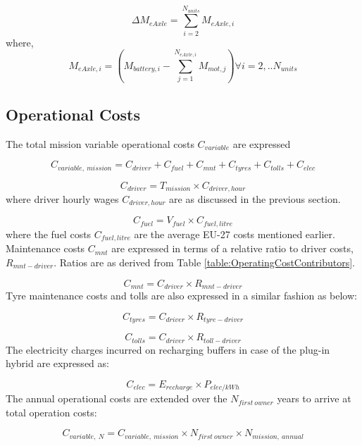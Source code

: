 \documentclass[ExampleMasters.tex]{subfiles}
\begin{document}
			\begin{equation}
				\Delta M_{eAxle} = \displaystyle \sum_{i=2}^{N_{units}} M_{eAxle,i}
			\end{equation}
			where, 
			\begin{equation}
				M_{eAxle,i} = (M_{battery,i} - \sum_{j=1}^{N_{eAxle,i}} M_{mot,j}) \forall i=2,..N_{units}
			\end{equation}

		\subsection{Operational Costs}
			The total mission variable operational costs $C_{variable}$ are expressed
			
			\begin{equation}
				C_{variable,\ mission} = C_{driver} + C_{fuel} + C_{mnt} + C_{tyres} + C_{tolls} + C_{elec}
			\end{equation}

			\begin{equation}
				C_{driver} = T_{mission} \times C_{driver, hour}
			\end{equation}
			where driver hourly wages $C_{driver, hour}$ are as discussed in the previous section.

			\begin{equation}
				C_{fuel} = V_{fuel} \times C_{fuel, litre}
			\end{equation}
			where the fuel costs $C_{fuel, litre}$ are the average EU-27 costs mentioned earlier. Maintenance costs $C_{mnt}$ are expressed in terms of a relative ratio to driver costs, $R_{mnt-driver}$. Ratios are as derived from Table \ref{table:OperatingCostContributors}.

			\begin{equation}
				C_{mnt} = C_{driver} \times R_{mnt-driver}
			\end{equation}
			Tyre maintenance costs and tolls are also expressed in a similar fashion as below:

			\begin{equation}
				C_{tyres} = C_{driver} \times R_{tyre-driver}
			\end{equation}

			\begin{equation}
				C_{tolls} = C_{driver} \times R_{toll-driver}
			\end{equation}
			The electricity charges incurred on recharging buffers in case of the plug-in hybrid are expressed as:

			\begin{equation}
				C_{elec} = E_{recharge} \times P_{elec/kWh}
			\end{equation}
			The annual operational costs are extended over the $N_{first\ owner}$ years to arrive at total operation costs:

			\begin{equation}
				C_{variable,\ N} = C_{variable,\ mission} \times N_{first\ owner} \times N_{mission,\ annual}
			\end{equation}
\end{document}
